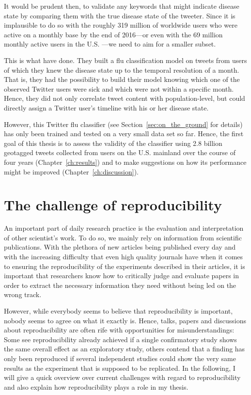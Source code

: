 \documentclass[11pt, a4paper,twoside]{report}\usepackage[]{graphicx}\usepackage[]{color}
\begin{document}
It would be prudent then, to validate any keywords that might indicate disease state by comparing them with the true disease state of the tweeter. Since it is implausible to do so with the roughly 319 million of worldwide users who were active on a monthly base by the end of 2016---or even with the 69 million monthly active users in the U.S. \citep{twitter_annual_2017}---we need to aim for a smaller subset.

This is what \cite{bodnar_ground_2014} have done. They built a flu classification model on tweets from users of which they knew the disease state up to the temporal resolution of a month. That is, they had the possibility to build their model knowing which one of the observed Twitter users were sick and which were not within a specific month. Hence, they did not only correlate tweet content with population-level, but could directly assign a Twitter user's timeline with his or her disease state. 

However, this Twitter flu classifier (see Section~\ref{sec:on_the_ground} for details) has only been trained and tested on a very small data set so far. Hence, the first goal of this thesis is to assess the validity of the classifier using 2.8 billion geotagged tweets collected from users on the U.S. mainland over the course of four years (Chapter~\ref{ch:results}) and to make suggestions on how its performance might be improved (Chapter~\ref{ch:discussion}).

\chapter{The challenge of reproducibility}
\label{ch:reproducibility}
An important part of daily research practice is the evaluation and interpretation of other scientist's work. To do so, we mainly rely on information from scientific publications. With the plethora of new articles being published every day and with the increasing difficulty that even high quality journals have when it comes to ensuring the reproducibility of the experiments described in their articles, it is important that researchers know how to critically judge and evaluate papers in order to extract the necessary information they need without being led on the wrong track. 

However, while everybody seems to believe that reproducibility is important, nobody seems to agree on what it exactly is. Hence, talks, papers and discussions about reproducibility are often rife with opportunities for misunderstandings: Some see reproducibility already achieved if a single confirmatory study shows the same overall effect as an exploratory study, others contend that a finding has only been reproduced if several independent studies could show the very same results as the experiment that is supposed to be replicated. In the following, I will give a quick overview over current challenges with regard to reproducibility and also explain how reproducibility plays a role in my thesis. 
\end{document}
